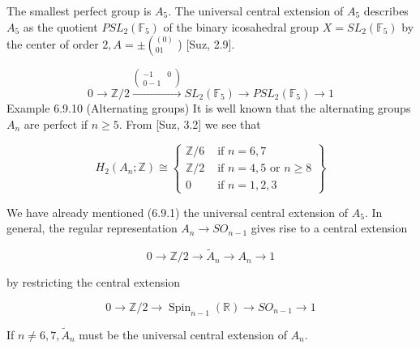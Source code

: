 \begin{example}
    The smallest perfect group is $A_5$. The universal central extension of $A_5$ describes $A_5$ as the quotient $P S L_2\left(\mathbb{F}_5\right)$ of the binary icosahedral group $X=S L_2\left(\mathbb{F}_5\right)$ by the center of order $2, A= \pm\left({ }_{01}^{(0)}\right.$ ) [Suz, 2.9].
    
        $$
        0 \longrightarrow \mathbb{Z} / 2 \xrightarrow{\left(\begin{array}{cc}
        -1 & 0 \\
        0-1
        \end{array}\right)} S L_2\left(\mathbb{F}_5\right) \longrightarrow P S L_2\left(\mathbb{F}_5\right) \longrightarrow 1
        $$     
        Example 6.9.10 (Alternating groups) It is well known that the alternating groups $A_n$ are perfect if $n \geq 5$. From [Suz, 3.2] we see that

        $$
        H_2\left(A_n ; \mathbb{Z}\right) \cong\left\{\begin{array}{ll}
        \mathbb{Z} / 6 & \text { if } n=6,7 \\
        \mathbb{Z} / 2 & \text { if } n=4,5 \text { or } n \geq 8 \\
        0 & \text { if } n=1,2,3
        \end{array}\right\}
        $$
        
        
        We have already mentioned (6.9.1) the universal central extension of $A_5$. In general, the regular representation $A_n \rightarrow S O_{n-1}$ gives rise to a central extension
        
        $$
        0 \rightarrow \mathbb{Z} / 2 \rightarrow \widetilde{A}_n \rightarrow A_n \rightarrow 1
        $$
        
        by restricting the central extension
        
        $$
        0 \rightarrow \mathbb{Z} / 2 \rightarrow \operatorname{Spin}_{n-1}(\mathbb{R}) \rightarrow S O_{n-1} \rightarrow 1
        $$
        
        
        If $n \neq 6,7, \tilde{A}_n$ must be the universal central extension of $A_n$.

    \end{example}

